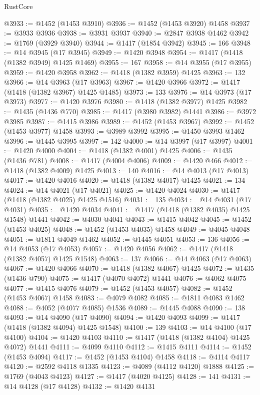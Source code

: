 \begin{lexlean}{RustCore}
\begin{coremodule}
@3933 := @1452 (@1453 @3910)
@3936 := @1452 (@1453 @3920) @1458
@3937 := @3933 @3936
@3938 := @3931 @3937
@3940 := @2847 @3938 @1462
@3942 := @1769 (@3929 @3940)
@3944 := @1417 (@1854 @3942)
@3945 := 166
@3948 := @14 @3945 (@17 @3945)
@3949 := @1420 @3948
@3954 := @1417 (@1418 (@1382 @3949) @1425 @1469)
@3955 := 167
@3958 := @14 @3955 (@17 @3955)
@3959 := @1420 @3958
@3962 := @1418 (@1382 @3959) @1425
@3963 := 132
@3966 := @14 @3963 (@17 @3963)
@3967 := @1420 @3966
@3972 := @1417 (@1418 (@1382 @3967) @1425 @1485)
@3973 := 133
@3976 := @14 @3973 (@17 @3973)
@3977 := @1420 @3976
@3980 := @1418 (@1382 @3977) @1425
@3982 := @1435 (@1436 @770)
@3985 := @1417 (@3980 @3982) @1441
@3986 := @3972 @3985
@3987 := @1415 @3986
@3989 := @1452 (@1453 @3967)
@3992 := @1452 (@1453 @3977) @1458
@3993 := @3989 @3992
@3995 := @1450 @3993 @1462
@3996 := @1445 @3995
@3997 := 142
@4000 := @14 @3997 (@17 @3997)
@4001 := @1420 @4000
@4004 := @1418 (@1382 @4001) @1425
@4006 := @1435 (@1436 @781)
@4008 := @1417 (@4004 @4006)
@4009 := @1420 @466
@4012 := @1418 (@1382 @4009) @1425
@4013 := 140
@4016 := @14 @4013 (@17 @4013)
@4017 := @1420 @4016
@4020 := @1418 (@1382 @4017) @1425
@4021 := 134
@4024 := @14 @4021 (@17 @4021)
@4025 := @1420 @4024
@4030 := @1417 (@1418 (@1382 @4025) @1425 @1516)
@4031 := 135
@4034 := @14 @4031 (@17 @4031)
@4035 := @1420 @4034
@4041 := @1417 (@1418 (@1382 @4035) @1425 @1548) @1441
@4042 := @4030 @4041
@4043 := @1415 @4042
@4045 := @1452 (@1453 @4025)
@4048 := @1452 (@1453 @4035) @1458
@4049 := @4045 @4048
@4051 := @1811 @4049 @1462
@4052 := @1445 @4051
@4053 := 136
@4056 := @14 @4053 (@17 @4053)
@4057 := @1420 @4056
@4062 := @1417 (@1418 (@1382 @4057) @1425 @1548)
@4063 := 137
@4066 := @14 @4063 (@17 @4063)
@4067 := @1420 @4066
@4070 := @1418 (@1382 @4067) @1425
@4072 := @1435 (@1436 @790)
@4075 := @1417 (@4070 @4072) @1441
@4076 := @4062 @4075
@4077 := @1415 @4076
@4079 := @1452 (@1453 @4057)
@4082 := @1452 (@1453 @4067) @1458
@4083 := @4079 @4082
@4085 := @1811 @4083 @1462
@4088 := @4052 (@4077 @4085) @1536
@4089 := @1445 @4088
@4090 := 138
@4093 := @14 @4090 (@17 @4090)
@4094 := @1420 @4093
@4099 := @1417 (@1418 (@1382 @4094) @1425 @1548)
@4100 := 139
@4103 := @14 @4100 (@17 @4100)
@4104 := @1420 @4103
@4110 := @1417 (@1418 (@1382 @4104) @1425 @4072) @1441
@4111 := @4099 @4110
@4112 := @1415 @4111
@4114 := @1452 (@1453 @4094)
@4117 := @1452 (@1453 @4104) @1458
@4118 := @4114 @4117
@4120 := @2592 @4118 @1335
@4123 := @4089 (@4112 @4120) @1888
@4125 := @1769 (@4043 @4123)
@4127 := @1417 (@4020 @4125)
@4128 := 141
@4131 := @14 @4128 (@17 @4128)
@4132 := @1420 @4131

\end{coremodule}
\end{lexlean}
